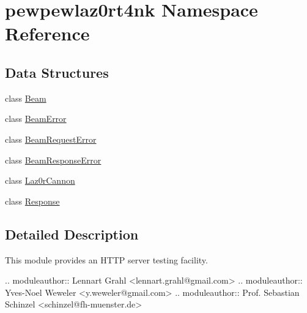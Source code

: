 \hypertarget{namespacepewpewlaz0rt4nk}{}\section{pewpewlaz0rt4nk Namespace Reference}
\label{namespacepewpewlaz0rt4nk}
\subsection*{Data Structures}
\begin{DoxyCompactItemize}
\item 
class \hyperlink{classpewpewlaz0rt4nk_1_1_beam}{Beam}
\item 
class \hyperlink{classpewpewlaz0rt4nk_1_1_beam_error}{Beam\+Error}
\item 
class \hyperlink{classpewpewlaz0rt4nk_1_1_beam_request_error}{Beam\+Request\+Error}
\item 
class \hyperlink{classpewpewlaz0rt4nk_1_1_beam_response_error}{Beam\+Response\+Error}
\item 
class \hyperlink{classpewpewlaz0rt4nk_1_1_laz0r_cannon}{Laz0r\+Cannon}
\item 
class \hyperlink{classpewpewlaz0rt4nk_1_1_response}{Response}
\end{DoxyCompactItemize}


\subsection{Detailed Description}
\begin{DoxyVerb}This module provides an HTTP server testing facility.

.. moduleauthor:: Lennart Grahl <lennart.grahl@gmail.com>
.. moduleauthor:: Yves-Noel Weweler <y.weweler@gmail.com>
.. moduleauthor:: Prof. Sebastian Schinzel <schinzel@fh-muenster.de>
\end{DoxyVerb}
 